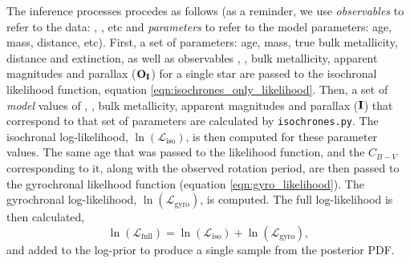 The inference processes procedes as follows (as a reminder, we use {\it
observables} to refer to the data: \teff, \logg, etc and {\it parameters} to
refer to the model parameters: age, mass, distance, etc).
First, a set of parameters: age, mass, true bulk metallicity, distance and
extinction, as well as observables \teff, \logg, bulk metallicity, apparent
magnitudes and parallax (${\bf O_I}$) for a single star are passed to the
isochronal likelihood function, equation
\eqref{eqn:isochrones_only_likelihood}.
Then, a set of {\it model} values of \teff, \logg, bulk metallicity, apparent
magnitudes and parallax (${\bf I}$) that correspond to that set of parameters
are calculated by {\tt isochrones.py}.
The isochronal log-likelihood, $\ln(\mathcal{L}_{\mathrm{iso}})$, is then
computed for these parameter values.
The same age that was passed to the likelihood function, and the $C_{B-V}$
corresponding to it, along with the observed rotation period, are then passed
to the gyrochronal likelhood function (equation \ref{eqn:gyro_likelihood}).
The gyrochronal log-likelihood, $\ln(\mathcal{L}_{\mathrm{gyro}})$, is
computed.
The full log-likelihood is then calculated,
\begin{equation} \label{eqn:both_likelihood}
\ln(\mathcal{L}_{\mathrm{full}})
= \ln(\mathcal{L}_{\mathrm{iso}}) + \ln(\mathcal{L}_{\mathrm{gyro}}),
\end{equation}
and added to the log-prior to produce a single sample from the posterior PDF.

